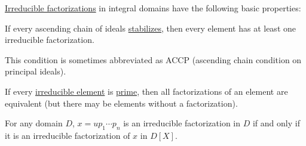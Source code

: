 \begin{proposition}\label{thm:def:irreducible_factorization}
  \hyperref[def:irreducible_factorization]{Irreducible factorizations} in integral domains have the following basic properties:
  \begin{thmenum}
     If every ascending chain of  ideals \hyperref[def:stabilizing_chain]{stabilizes}, then every element has at least one irreducible factorization.

    This condition is sometimes abbreviated as ACCP (ascending chain condition on principal ideals).

     If every \hyperref[def:domain_divisibility/irreducible]{irreducible element} is \hyperref[def:domain_divisibility/prime]{prime}, then all factorizations of an element are equivalent (but there may be elements without a factorization).

     For any domain \( D \), \( x = u p_1 \cdots p_n \) is an irreducible factorization in \( D \) if and only if it is an irreducible factorization of \( x \) in \( D[X] \).
  \end{thmenum}
\end{proposition}
